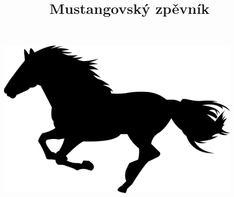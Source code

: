 \documentclass[11pt]{article}
\title{\Huge{Mustangovský zpěvník}}
\date{}
\begin{document}
	\maketitle
	\thispagestyle{empty}
	\includegraphics[width=0.9\textwidth]{cover}
	\newpage
	

	\begin{songs}{}%
	
	\end{songs}

\end{document}
